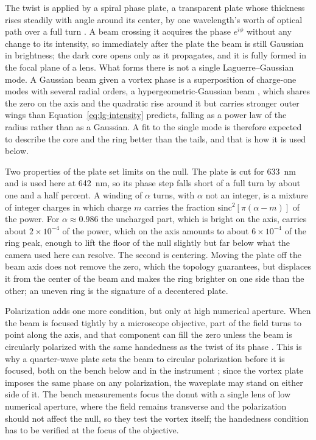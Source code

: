\documentclass{article}
\begin{document}
The twist is applied by a spiral phase plate, a transparent plate whose thickness rises steadily
with angle around its center, by one wavelength's worth of optical path over a full turn
\cite{beijersbergenHelicalwavefrontLaserBeams1994}. A beam crossing it acquires the phase
$e^{i\phi}$ without any change to its intensity, so immediately after the plate the beam is still
Gaussian in brightness; the dark core opens only as it propagates, and it is fully formed in the
focal plane of a lens. What forms there is not a single Laguerre--Gaussian mode. A Gaussian beam
given a vortex phase is a superposition of charge-one modes with several radial orders, a
hypergeometric-Gaussian beam \cite{karimiHypergeometricGaussianModes2007}, which shares the zero on
the axis and the quadratic rise around it but carries stronger outer wings than
Equation~\ref{eq:lg-intensity} predicts, falling as a power law of the radius rather than as a
Gaussian. A fit to the single mode is therefore expected to describe
the core and the ring better than the tails, and that is how it is used below.

Two properties of the plate set limits on the null. The plate is cut for 633~nm and is used here
at 642~nm, so its phase step falls short of a full turn by about one and a half percent. A winding
of $\alpha$ turns, with $\alpha$ not an integer, is a mixture of integer charges in which charge $m$
carries the fraction $\mathrm{sinc}^2[\pi(\alpha-m)]$ of the power. For $\alpha \approx 0.986$ the
uncharged part, which is bright on the axis, carries about $2\times10^{-4}$ of the power, which on
the axis amounts to about $6\times10^{-4}$ of the ring peak, enough to lift the floor of the null
slightly but far below what the camera used here can resolve. The second
is centering. Moving the plate off the beam axis does not remove the zero, which the topology
guarantees, but displaces it from the center of the beam and makes the ring brighter on one side
than the other; an uneven ring is the signature of a decentered plate.

Polarization adds one more condition, but only at high numerical aperture. When the beam is
focused tightly by a microscope objective, part of the field turns to point along the axis, and that
component can fill the zero unless the beam is circularly polarized with the same handedness as
the twist of its phase \cite{lopezOptimizationCharacterizationToroidal2023}. This is why a
quarter-wave plate sets the beam to circular polarization before it is focused, both on the bench
below and in the instrument \cite{becerraQuantifyingProteinInteractions2024}; since the vortex
plate imposes the same phase on any polarization, the waveplate may stand on either side of it.
The bench measurements
focus the donut with a single lens of low numerical aperture, where the field remains transverse
and the polarization should not affect the null, so they test the vortex itself; the handedness
condition has to be verified at the focus of the objective.
\end{document}
